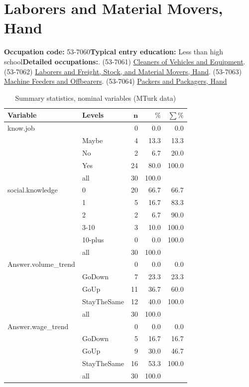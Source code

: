 \documentclass[a4paper,10pt]{article}\usepackage[]{graphicx}\usepackage[]{color}
\begin{document}
\newpage\section{Laborers and Material Movers, Hand}\textbf{Occupation code:} 53-7060\newline\textbf{Typical entry education:} Less than high school\newline\textbf{Detailed occupations:}. (53-7061)  \href{http://www.bls.gov/oes/current/oes537061.htm}{Cleaners of Vehicles and Equipment}. (53-7062)  \href{http://www.bls.gov/oes/current/oes537062.htm}{Laborers and Freight, Stock, and Material Movers, Hand}. (53-7063)  \href{http://www.bls.gov/oes/current/oes537063.htm}{Machine Feeders and Offbearers}. (53-7064)  \href{http://www.bls.gov/oes/current/oes537064.htm}{Packers and Packagers, Hand}\newline%
\begin{table}[ht]
\centering
{\footnotesize
\begin{tabular}{ll|rrr}
 \textbf{Variable} & \textbf{Levels} & $\mathbf{n}$ & $\mathbf{\%}$ & $\mathbf{\sum \%}$ \\ 
  \hline
know.job &  & 0 & 0.0 & 0.0 \\ 
   & Maybe & 4 & 13.3 & 13.3 \\ 
   & No & 2 & 6.7 & 20.0 \\ 
   & Yes & 24 & 80.0 & 100.0 \\ 
   \hline
 & all & 30 & 100.0 &  \\ 
   \hline
\hline
social.knowledge & 0 & 20 & 66.7 & 66.7 \\ 
   & 1 & 5 & 16.7 & 83.3 \\ 
   & 2 & 2 & 6.7 & 90.0 \\ 
   & 3-10 & 3 & 10.0 & 100.0 \\ 
   & 10-plus & 0 & 0.0 & 100.0 \\ 
   \hline
 & all & 30 & 100.0 &  \\ 
   \hline
\hline
Answer.volume\_trend &  & 0 & 0.0 & 0.0 \\ 
   & GoDown & 7 & 23.3 & 23.3 \\ 
   & GoUp & 11 & 36.7 & 60.0 \\ 
   & StayTheSame & 12 & 40.0 & 100.0 \\ 
   \hline
 & all & 30 & 100.0 &  \\ 
   \hline
\hline
Answer.wage\_trend &  & 0 & 0.0 & 0.0 \\ 
   & GoDown & 5 & 16.7 & 16.7 \\ 
   & GoUp & 9 & 30.0 & 46.7 \\ 
   & StayTheSame & 16 & 53.3 & 100.0 \\ 
   \hline
 & all & 30 & 100.0 &  \\ 
   \hline
\hline
\end{tabular}
}
\caption{Summary statistics, nominal variables (MTurk data)} 
\label{tab1:53-7060}
\end{table}
\end{document}
